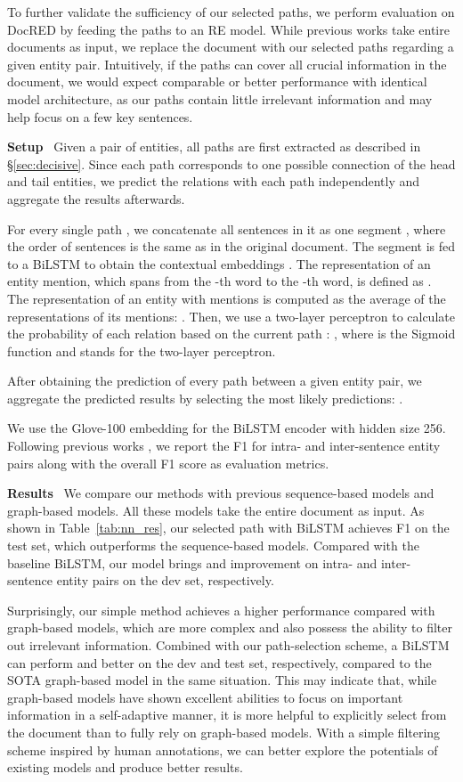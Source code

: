 \documentclass[11pt,a4paper]{article}
\begin{document}
To further validate the sufficiency of our selected paths, we perform evaluation on DocRED  by feeding the paths to an RE model.  While previous works take entire documents as input, we replace the document with our selected paths regarding a given entity pair. Intuitively, if the paths can cover all crucial information in the document, we would expect comparable or better 
performance with identical model architecture, as our paths contain little irrelevant information and may help focus on a few key sentences.

\noindent\textbf{Setup}~
Given a pair of entities, all paths are first extracted as described in \S\ref{sec:decisive}. Since each path corresponds to one possible connection of the head and tail entities, we predict the relations with each path independently and aggregate the results afterwards.

For every single path , we concatenate all sentences in it as one segment , where the order of sentences is the same as in the original document. The segment is fed to a BiLSTM to obtain the contextual embeddings . The representation of an entity mention, which spans from the -th word to the -th word, is defined as . The representation of an entity  with  mentions is computed as the average of the representations of its mentions: . Then, we use a two-layer perceptron to calculate the probability of each relation  based on the current path : , where  is the Sigmoid function and  stands for the two-layer perceptron.

After obtaining the prediction of every path between a given entity pair, we aggregate the predicted results by selecting the most likely predictions: .

We use the Glove-100 \cite{glove} embedding for the BiLSTM encoder with hidden size 256. Following previous works \cite{nan2020reasoning}, we report the F1 for intra- and inter-sentence entity pairs along with the overall F1 score as evaluation metrics.

\noindent\textbf{Results}~
We compare our methods with previous sequence-based models and graph-based models. All these models take the entire document as input. As shown in Table~\ref{tab:nn_res}, our selected path with BiLSTM achieves  F1 on the test set, which outperforms the sequence-based models. Compared with the baseline BiLSTM, our model brings  and  improvement on intra- and inter-sentence entity pairs on the dev set, respectively. 

Surprisingly, our simple method achieves a higher performance compared with graph-based models, which are more complex and also possess the ability to filter out irrelevant information. Combined with our path-selection scheme, a BiLSTM can perform  and  better on the dev and test set, respectively, compared to the SOTA graph-based model in the same situation. This may indicate that, while graph-based models have shown excellent abilities to focus on important information in a self-adaptive manner, it is more helpful to explicitly select from the document than to fully rely on graph-based models. With a simple filtering scheme inspired by human annotations, we can better explore the potentials of existing models and produce better results.
\end{document}
